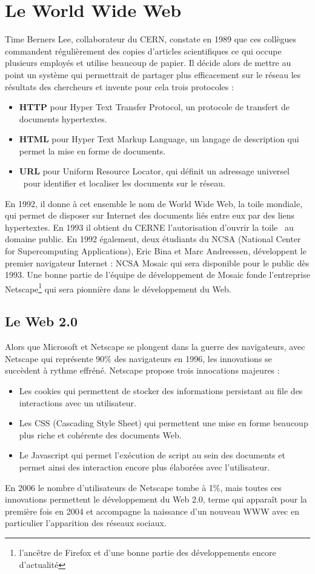\documentclass[a4paper,11pt]{book}
\begin{document}
\section{Le World Wide Web}
Time Berners Lee, collaborateur du CERN, constate en 1989 que ces collègues commandent régulièrement des copies d'articles scientifiques ce qui occupe plusieurs employés et utilise beaucoup de papier. Il décide alors de mettre au point un système qui permettrait de partager plus efficacement sur le réseau les résultats des chercheurs et invente pour cela trois protocoles :
\begin{itemize}
    \item \textbf{HTTP} pour Hyper Text Transfer Protocol, un protocole de transfert de documents hypertextes.
    \item \textbf{HTML} pour Hyper Text Markup Language, un langage de description qui permet la mise en forme de documents.
    \item \textbf{URL} pour Uniform Resource Locator, qui définit un adressage \guillemotleft universel \guillemotright~pour identifier et localiser les documents sur le réseau.
\end{itemize} 
En 1992, il donne à cet ensemble le nom de World Wide Web, la toile mondiale, qui permet de disposer sur Internet des documents liés entre eux par des liens hypertextes. En 1993 il obtient du CERNE l'autorisation d'ouvrir la \guillemotleft toile \guillemotright~au domaine public.
En 1992 également, deux étudiants du NCSA (National Center for Supercomputing Applications), Eric Bina et Marc Andreessen, développent le premier navigateur Internet : NCSA Mosaic qui sera disponible pour le public dès 1993. Une bonne partie de l'équipe de développement de Mosaic fonde l'entreprise Netscape\footnote{l'ancêtre de Firefox et d'une bonne partie des développements encore d'actualité} qui sera pionnière dans le développement du Web. 

\subsection{Le Web 2.0}
Alors que Microsoft et Netscape se plongent dans la \guillemotleft guerre des navigateurs\guillemotright, avec Netscape qui représente 90\% des navigateurs en 1996, les innovations se succèdent à rythme effréné. Netscape propose trois innocations majeures : 
\begin{itemize}
    \item Les cookies qui permettent de stocker des informations persistant au file des interactions avec un utilisateur.
    \item Les CSS (Cascading Style Sheet) qui permettent une mise en forme beaucoup plus riche et cohérente des documents Web.
    \item Le Javascript qui permet l'exécution de script au sein des documents et permet ainsi des interaction encore plus élaborées avec l'utilisateur.
\end{itemize}
En 2006 le nombre d'utilisateurs de Netscape tombe à 1\%, mais toutes ces innovations permettent le développement du Web 2.0, terme qui apparaît pour la première fois en 2004 et accompagne la naissance d'un nouveau WWW avec en particulier l'apparition des réseaux sociaux.
\end{document}
